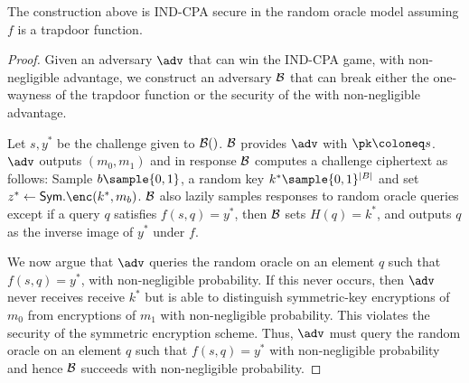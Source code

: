 \begin{theorem}
    The construction above is IND-CPA secure in the random oracle model assuming $f$ is a trapdoor function.
\end{theorem}
\begin{proof}
    Given an adversary $\adv$ that can win the IND-CPA game, with non-negligible advantage, we construct an adversary $\mathcal{B}$ that can break either the one-wayness of the trapdoor function or the security of the with non-negligible advantage.

    Let $s, y^*$ be the challenge given to $\mathcal{B}()$. $\mathcal{B}$ provides $\adv$ with $\pk \coloneq s$. $\adv$ outputs $(m_0, m_1)$ and in response $\mathcal{B}$ computes a challenge ciphertext as follows: Sample $b \sample \{0,1\}$, a random key $k^* \sample \{0,1\}^{|B|}$ and set $z^* \gets \mathsf{Sym}.\enc(k^*, m_b)$. $\mathcal{B}$ also lazily samples responses to random oracle queries except if a query $q$ satisfies $f(s, q) = y^*$, then $\mathcal{B}$ sets $H(q) = k^*$, and outputs $q$ as the inverse image of $y^*$ under $f$.

    We now argue that $\adv$ queries the random oracle on an element $q$ such that $f(s, q) = y^*$, with non-negligible probability. If this never occurs, then $\adv$ never receives receive $k^*$ but is able to distinguish symmetric-key encryptions of $m_0$ from encryptions of $m_1$ with non-negligible probability. This violates the security of the symmetric encryption scheme. Thus, $\adv$ must query the random oracle on an element $q$ such that $f(s, q) = y^*$ with non-negligible probability and hence $\mathcal{B}$ succeeds with non-negligible probability.
\end{proof}